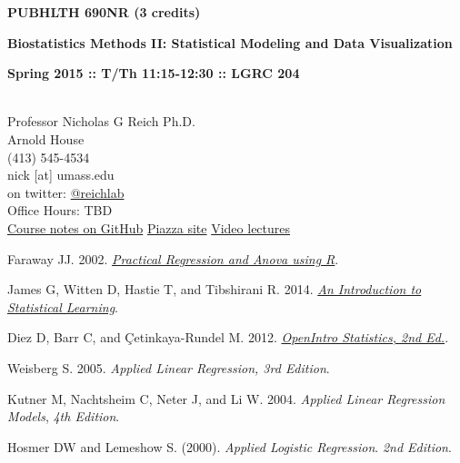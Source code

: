 \documentclass[10pt]{article}
\begin{document}
\centerline{\bf \large PUBHLTH 690NR (3 credits)} 
\centerline{\bf \large Biostatistics Methods II: Statistical Modeling and Data Visualization}
\centerline{\bf Spring 2015 :: T/Th 11:15-12:30  :: LGRC 204 }

\vspace{.25in}
\\
\noindent Professor Nicholas G Reich Ph.D. \\
 Arnold House \\
\noindent (413) 545-4534 \\
\noindent nick [at] umass.edu \\
\noindent on twitter: \href{https://twitter.com/reichlab}{@reichlab}\\
\noindent Office Hours: TBD \\
\noindent \href{https://github.com/nickreich/stat-modeling-2015}{Course notes on GitHub}
\noindent \href{https://piazza.com/umass/spring2015/pubhlth690nr/home}{Piazza site}
\noindent \href{https://umass.echo360.com/ess/portal/section/6c47935b-4969-45f0-8498-904023f6eb3f}{Video lectures}


\bigskip
{}


Faraway JJ. 2002. \emph{\href{http://cran.r-project.org/doc/contrib/Faraway-PRA.pdf}{Practical Regression and Anova using R}}.
  
James G, Witten D, Hastie T, and Tibshirani R. 2014. \emph{\href{http://www-bcf.usc.edu/~gareth/ISL/}{An Introduction to Statistical Learning}}.
  
Diez D, Barr C, and \c{C}etinkaya-Rundel M. 2012. \emph{\href{http://www.openintro.org/stat/index.php}{OpenIntro Statistics, 2nd Ed.}}.


Weisberg S. 2005. \emph{Applied Linear Regression, 3rd Edition}. 

Kutner M, Nachtsheim C, Neter J, and Li W. 2004. \emph{Applied Linear Regression Models}, \emph{4th Edition}. %

Hosmer DW and Lemeshow S. (2000). \emph{Applied Logistic Regression}. \emph{2nd Edition}. %
\end{document}
